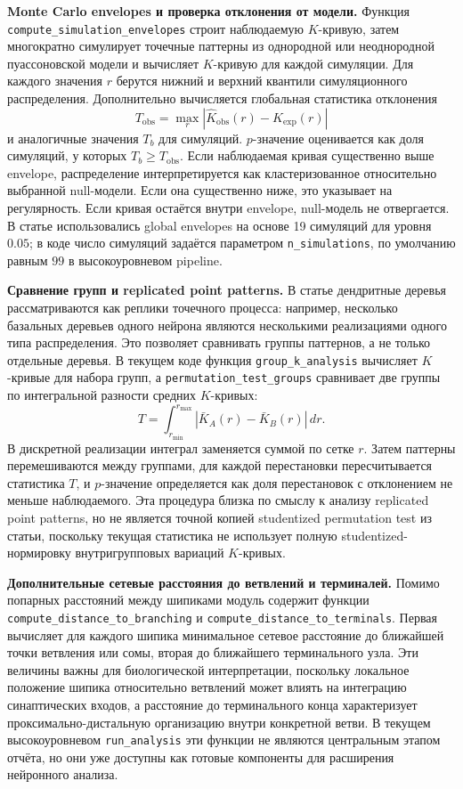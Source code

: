 \documentclass[12pt,a4paper]{article}
\begin{document}
\noindent\textbf{Monte Carlo envelopes и проверка отклонения от модели.}
Функция \texttt{compute\_simulation\_envelopes} строит наблюдаемую \(K\)-кривую, затем многократно симулирует точечные паттерны из однородной или неоднородной пуассоновской модели и вычисляет \(K\)-кривую для каждой симуляции. Для каждого значения \(r\) берутся нижний и верхний квантили симуляционного распределения. Дополнительно вычисляется глобальная статистика отклонения
\[
T_{\mathrm{obs}}=\max_r |\hat K_{\mathrm{obs}}(r)-K_{\mathrm{exp}}(r)|
\]
и аналогичные значения \(T_b\) для симуляций. \(p\)-значение оценивается как доля симуляций, у которых \(T_b\geq T_{\mathrm{obs}}\). Если наблюдаемая кривая существенно выше envelope, распределение интерпретируется как кластеризованное относительно выбранной null-модели. Если она существенно ниже, это указывает на регулярность. Если кривая остаётся внутри envelope, null-модель не отвергается. В статье использовались global envelopes на основе 19 симуляций для уровня \(0.05\); в коде число симуляций задаётся параметром \texttt{n\_simulations}, по умолчанию равным \(99\) в высокоуровневом pipeline.

\noindent\textbf{Сравнение групп и replicated point patterns.}
В статье дендритные деревья рассматриваются как реплики точечного процесса: например, несколько базальных деревьев одного нейрона являются несколькими реализациями одного типа распределения. Это позволяет сравнивать группы паттернов, а не только отдельные деревья. В текущем коде функция \texttt{group\_k\_analysis} вычисляет \(K\)-кривые для набора групп, а \texttt{permutation\_test\_groups} сравнивает две группы по интегральной разности средних \(K\)-кривых:
\[
T=\int_{r_{\min}}^{r_{\max}}
\left|\bar K_A(r)-\bar K_B(r)\right|\,dr.
\]
В дискретной реализации интеграл заменяется суммой по сетке \(r\). Затем паттерны перемешиваются между группами, для каждой перестановки пересчитывается статистика \(T\), и \(p\)-значение определяется как доля перестановок с отклонением не меньше наблюдаемого. Эта процедура близка по смыслу к анализу replicated point patterns, но не является точной копией studentized permutation test из статьи, поскольку текущая статистика не использует полную studentized-нормировку внутригрупповых вариаций \(K\)-кривых.

\noindent\textbf{Дополнительные сетевые расстояния до ветвлений и терминалей.}
Помимо попарных расстояний между шипиками модуль содержит функции \texttt{compute\_distance\_to\_branching} и \texttt{compute\_distance\_to\_terminals}. Первая вычисляет для каждого шипика минимальное сетевое расстояние до ближайшей точки ветвления или сомы, вторая до ближайшего терминального узла. Эти величины важны для биологической интерпретации, поскольку локальное положение шипика относительно ветвлений может влиять на интеграцию синаптических входов, а расстояние до терминального конца характеризует проксимально-дистальную организацию внутри конкретной ветви. В текущем высокоуровневом \texttt{run\_analysis} эти функции не являются центральным этапом отчёта, но они уже доступны как готовые компоненты для расширения нейронного анализа.
\end{document}
